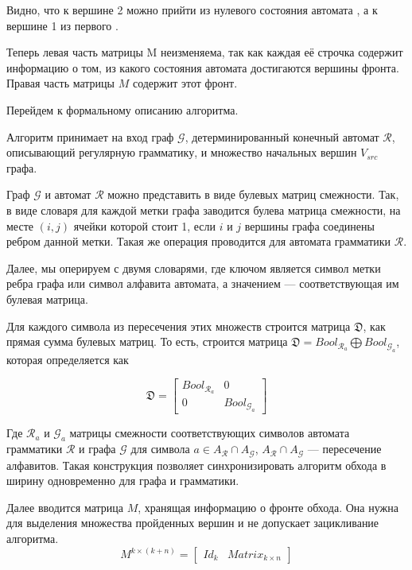 Видно, что к вершине 2 можно прийти из нулевого состояния автомата  , а к вершине 1 из первого  .

Теперь левая часть матрицы M неизменяема, так как каждая её строчка содержит информацию о том, из какого состояния автомата достигаются вершины фронта.
Правая часть матрицы $M$ содержит этот фронт.


Перейдем к формальному описанию алгоритма.


Алгоритм принимает на вход граф $\mathcal{G}$, детерминированный конечный автомат $\mathcal{R}$, описывающий регулярную грамматику, и множество начальных вершин $V_{src}$ графа.

Граф $\mathcal{G}$ и автомат $\mathcal{R}$ можно представить в виде булевых матриц смежности. Так, в виде словаря для каждой метки графа заводится булева матрица смежности, на месте $(i, j)$ ячейки которой стоит 1, если $i$ и $j$ вершины графа соединены ребром данной метки. Такая же операция проводится для автомата грамматики $\mathcal{R}$.

Далее, мы оперируем с двумя словарями, где ключом является символ метки ребра графа или символ алфавита автомата, а значением --- соответствующая им булевая матрица.

Для каждого символа из пересечения этих множеств строится матрица $\mathfrak{D}$, как прямая сумма булевых матриц. То есть, строится матрица $\mathfrak{D} = Bool_{\mathcal{R}_a} \bigoplus Bool_{\mathcal{G}_a}$, которая определяется как

\begin{equation}
\mathfrak{D} = 
  \left[
    \begin{matrix}
        Bool_{\mathcal{R}_a} & 0\\
        0 & Bool_{\mathcal{G}_a}
    \end{matrix}
  \right]
\end{equation}

Где $\mathcal{R}_{a}$ и $\mathcal{G}_{a}$ матрицы смежности соответствующих символов автомата грамматики $\mathcal{R}$ и графа $\mathcal{G}$ для символа $a \in A_\mathcal{R} \cap A_\mathcal{G}$, $A_\mathcal{R} \cap A_\mathcal{G}$ --- пересечение алфавитов. Такая конструкция позволяет синхронизировать алгоритм обхода в ширину одновременно для графа и грамматики.

Далее вводится матрица $M$, хранящая информацию о фронте обхода. Она нужна для выделения множества пройденных вершин и не допускает зацикливание алгоритма.
\begin{equation}
M^{k \times (k + n)} =
  \left[
    \begin{matrix}
        Id_k & Matrix_{k \times n }
    \end{matrix}
  \right]
\end{equation}

